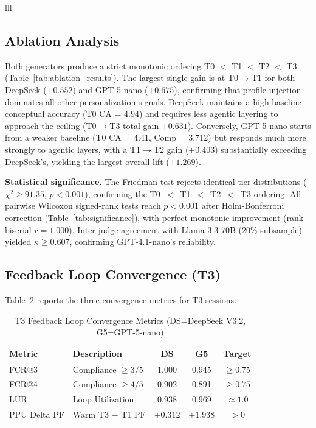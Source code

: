 \documentclass[conference]{IEEEtran}
\begin{document}
\begin{table}[htbp]
\begin{center}
\begin{tabular}{lll}
\subsection{Ablation Analysis}

Both generators produce a strict monotonic ordering T0 $<$ T1 $<$ T2 $<$ T3 (Table~\ref{tab:ablation_results}). The largest single gain is at T0$\to$T1 for both DeepSeek ($+0.552$) and GPT-5-nano ($+0.675$), confirming that profile injection dominates all other personalization signals. DeepSeek maintains a high baseline conceptual accuracy (T0 CA = 4.94) and requires less agentic layering to approach the ceiling (T0$\to$T3 total gain $+0.631$). Conversely, GPT-5-nano starts from a weaker baseline (T0 CA = 4.41, Comp = 3.712) but responds much more strongly to agentic layers, with a T1$\to$T2 gain ($+0.403$) substantially exceeding DeepSeek's, yielding the largest overall lift ($+1.269$). 

\textbf{Statistical significance.} The Friedman test rejects identical tier distributions ($\chi^2 \geq 91.35$, $p < 0.001$), confirming the T0~$<$~T1~$<$~T2~$<$~T3 ordering. All pairwise Wilcoxon signed-rank tests reach $p < 0.001$ after Holm-Bonferroni correction (Table~\ref{tab:significance}), with perfect monotonic improvement (rank-biserial $r = 1.000$). Inter-judge agreement with Llama 3.3 70B (20\% subsample) yielded $\kappa \geq 0.607$, confirming GPT-4.1-nano's reliability.

\subsection{Feedback Loop Convergence (T3)}

Table~\ref{tab:convergence} reports the three convergence metrics for T3 sessions.

\begin{table}[htbp]
\caption{T3 Feedback Loop Convergence Metrics (DS=DeepSeek V3.2, G5=GPT-5-nano)}
\label{tab:convergence}
\begin{center}
\scriptsize
\setlength{\tabcolsep}{6pt}
\begin{tabular}{llccc}
\toprule
\textbf{Metric} & \textbf{Description} & \textbf{DS} & \textbf{G5} & \textbf{Target} \\
\midrule
FCR@3 & Compliance $\geq 3/5$ & 1.000 & 0.945 & $\geq 0.75$ \\
FCR@4 & Compliance $\geq 4/5$ & 0.902 & 0.891 & $\geq 0.75$ \\
LUR   & Loop Utilization     & 0.938 & 0.969 & $\approx 1.0$ \\
PPU Delta PF & Warm T3 $-$ T1 PF & $+0.312$ & $+1.938$ & $> 0$ \\
\bottomrule
\end{tabular}
\end{center}
\end{table}


\end{tabular}
\end{center}
\end{table}
\end{document}
